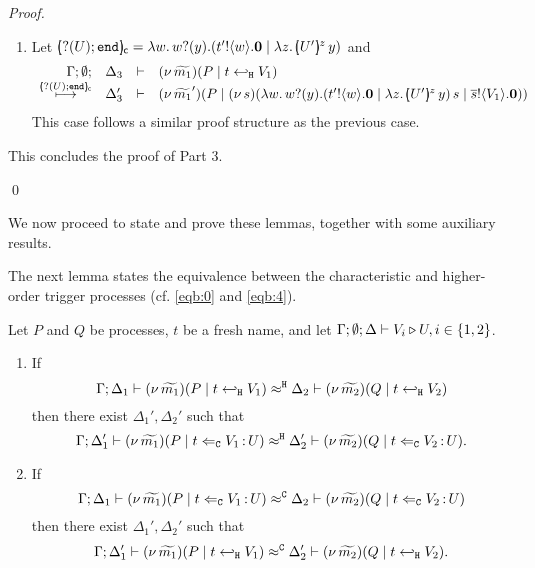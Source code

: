\begin{proof}
\begin{enumerate}[$-$]
\begin{enumerate}
\begin{enumerate}
						\item	Let $\omapchar{\btinp{U} \tinact} = \abs{w}{ \binp{w}{y} ( \bout{t'}{w} \inact \Par \appl{\abs{z}{\mapchar{U'}{z}}}{y} ) } $
								and
							\[	
								\mhorel{\Gamma}{\Delta_3}{\newsp{\widetilde{m_1}}{P \Par \htrigger{t}{V_1}  } }
								{\hby{\omapchar{\btinp{U}\tinact}}}
								{\Delta_3'}{}
								{\newsp{\widetilde{m_1}'}{P \Par \newsp{s}{\appl{\abs{w}{ \binp{w}{y} ( \bout{t'}{w} \inact \Par \appl{\abs{z}{\mapchar{U'}{z}}}{y} ) }}{s} \Par \bout{\dual{s}}{V_1} \inact}}}
							\]
							This case follows a similar proof structure as the previous case.
				\end{enumerate}
				This concludes the proof of Part 3. 
	\end{enumerate}
\end{enumerate}
\qed
\end{proof}


\noi
We now proceed to state and prove these lemmas, together with some auxiliary results.

The next lemma states the equivalence between the characteristic
and higher-order trigger processes (cf. \eqref{eqb:0} and \eqref{eqb:4}).

\begin{lemma}
	\label{lem:trigger_equiv}
	Let $P$ and $Q$ be processes, $t$ be a fresh name, and
	let $\Gamma; \emptyset; \Delta \vdash V_i \triangleright U, i \in \{1, 2\}$.

	\begin{enumerate}[1)]
		\item	If
				\[
					\Gamma; \Delta_1 \vdash (\nu\, \widetilde{m_1})(P \;|\; t \hookleftarrow_{\mathtt{H}} V_1) \approx^\mathtt{H} \Delta_2 \vdash (\nu\, \widetilde{m_2})(Q \;|\; t \hookleftarrow_{\mathtt{H}} V_2 )
				\]
				then there exist $\Delta_1', \Delta_2'$ such that 
				\[
					\Gamma; \Delta_1' \vdash (\nu\, \widetilde{m_1})(P \;|\; t \Leftarrow_{\mathtt{C}} V_1{\,:\,}U) \approx^\mathtt{H} \Delta_2' \vdash (\nu\, \widetilde{m_2})(Q \;|\; t \Leftarrow_{\mathtt{C}} V_2{\,:\,}U).
				\]

		\item	If
				\[
					\Gamma; \Delta_1 \vdash (\nu\, \widetilde{m_1})(P \;|\; t \Leftarrow_{\mathtt{C}} V_1{\,:\,}U) \approx^\mathtt{C} \Delta_2 \vdash (\nu\, \widetilde{m_2})(Q \;|\; t \Leftarrow_{\mathtt{C}} V_2{\,:\,}U)
				\]
				then there exist $\Delta_1', \Delta_2'$ such that
				\[
					\Gamma; \Delta_1' \vdash (\nu\, \widetilde{m_1})(P \;|\; t \hookleftarrow_{\mathtt{H}} V_1) \approx^\mathtt{C} \Delta_2' \vdash (\nu\, \widetilde{m_2})(Q \;|\; t \hookleftarrow_{\mathtt{H}} V_2 ).
				\]
	\end{enumerate}
\end{lemma}

